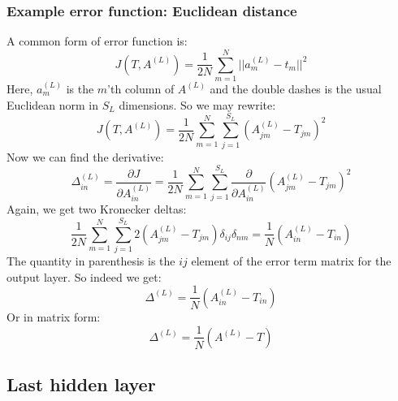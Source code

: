 \documentclass[12pt, a4paper]{article}
\numberwithin{equation}{section}
\begin{document}
\subsubsection{Example error function: Euclidean distance}
A common form of error function is:
\begin{equation}
J(T,A^{(L)})=\frac{1}{2N}\sum_{m=1}^N||a^{(L)}_m-t_m||^2
\end{equation}
Here, $a^{(L)}_m$ is the $m$'th column of $A^{(L)}$ and the double dashes is the usual Euclidean norm in $S_L$ dimensions. So we may rewrite:
\begin{equation}
J(T,A^{(L)})=\frac{1}{2N}\sum_{m=1}^N\sum_{j=1}^{S_L}(A^{(L)}_{jm}-T_{jm})^2
\end{equation}
Now we can find the derivative:
\begin{equation}
\Delta^{(L)}_{in}=\frac{\partial J}{\partial A^{(L)}_{in}}=\frac{1}{2N}\sum_{m=1}^N\sum_{j=1}^{S_L}\frac{\partial}{\partial A^{(L)}_{in}}(A^{(L)}_{jm}-T_{jm})^2
\end{equation}
Again, we get two Kronecker deltas:
\begin{equation}
\frac{1}{2N}\sum_{m=1}^N\sum_{j=1}^{S_L}2(A^{(L)}_{jm}-T_{jm})\delta_{ij}\delta_{nm}=\frac{1}{N}(A^{(L)}_{in}-T_{in})
\end{equation}
The quantity in parenthesis is the $ij$ element of the error term matrix for the output layer. So indeed we get:
\begin{equation}
\Delta^{(L)}=\frac{1}{N}\left(A^{(L)}_{in}-T_{in}\right)
\end{equation}
Or in matrix form:
\begin{equation}
\Delta^{(L)}=\frac{1}{N}\left(A^{(L)}-T\right)
\end{equation}

\subsection{Last hidden layer}
\end{document}
